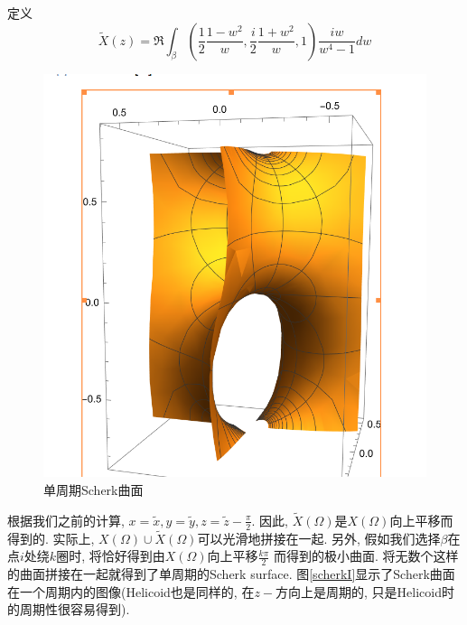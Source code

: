 定义
\begin{equation}
    \tilde{X}(z)=\Re \int_{\beta}(\frac{1}{2}\frac{1-w^2}{w}, \frac{i}{2}\frac{1+w^2}{w},1)\frac{iw}{w^4-1}dw
\end{equation}
\begin{figure}[ht]
    \centering
    \includegraphics[scale=0.8]{images/scherkI.png}
    \caption{单周期Scherk曲面}
    \label{scherkI}
\end{figure}
根据我们之前的计算, $x=\tilde{x}, y=\tilde{y}, z=\tilde{z}-\frac{\pi}{2}$. 因此, $\tilde{X}(\Omega)$是$X(\Omega)$向上平移而得到的. 实际上, $X(\Omega)\cup \tilde{X}(\Omega)$可以光滑地拼接在一起. 另外, 假如我们选择$\beta$在点$i$处绕$k$圈时, 将恰好得到由$X(\Omega)$向上平移$\frac{k\pi}{2}$ 而得到的极小曲面. 将无数个这样的曲面拼接在一起就得到了单周期的Scherk surface. 图\eqref{scherkI}显示了Scherk曲面在一个周期内的图像(Helicoid也是同样的, 在$z-$方向上是周期的, 只是Helicoid时的周期性很容易得到).
